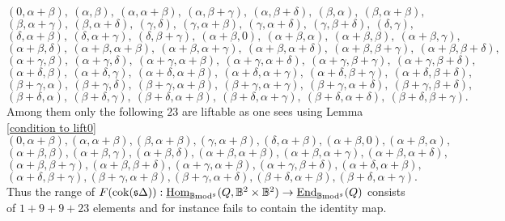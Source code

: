 \documentclass[12pt]{article}
\def\Homi{{\underline{\rm Hom}}}
\def\Endi{{\underline{\rm End}}}
\def\scoker{{\rm cok}}
\def\B{{\mathbb B}}
\def\yb{\mathfrak{s}}
\def\b2{{\rm \B mod^{\mathfrak s}}}
\begin{document}
$$
 (0 , \alpha +\beta  ),\ (
 \alpha  , \beta  ),\ (
 \alpha  , \alpha +\beta  ),\ (
 \alpha  , \beta +\gamma  ),\ (
 \alpha  , \beta +\delta  ),\ (
 \beta  , \alpha  ),\ (
 \beta  , \alpha +\beta  ),\ $$ $$ (
 \beta  , \alpha +\gamma  ),\ (
 \beta  , \alpha +\delta  ),\  (
 \gamma  , \delta  ),\   (
 \gamma  , \alpha +\beta  ),\ (
 \gamma  , \alpha +\delta  ),\ (
 \gamma  , \beta +\delta  ),\ (
 \delta  , \gamma  ),\ $$ $$  (
 \delta  , \alpha +\beta  ),\ (
 \delta  , \alpha +\gamma  ),\  (
 \delta  , \beta +\gamma  ),\ (
 \alpha +\beta  , 0 ),\ (
 \alpha +\beta  , \alpha  ),\ (
 \alpha +\beta  , \beta  ),\  (
 \alpha +\beta  , \gamma  ),\ $$ $$  (
 \alpha +\beta  , \delta  ),\ (
 \alpha +\beta  , \alpha +\beta  ),\   (
 \alpha +\beta  , \alpha +\gamma  ),\ (
 \alpha +\beta  , \alpha +\delta  ),\ (
 \alpha +\beta  , \beta +\gamma  ),\ (
 \alpha +\beta  , \beta +\delta  ),\  $$ $$  (
 \alpha +\gamma  , \beta  ),\ (
 \alpha +\gamma  , \delta  ),\  (
 \alpha +\gamma  , \alpha +\beta  ),\ (
 \alpha +\gamma  , \alpha +\delta  ),\   (
 \alpha +\gamma  , \beta +\gamma  ),\ (
 \alpha +\gamma  , \beta +\delta  ),\ $$ $$ (
 \alpha +\delta  , \beta  ),\ (
 \alpha +\delta  , \gamma  ),\ (
 \alpha +\delta  , \alpha +\beta  ),\   (
 \alpha +\delta  , \alpha +\gamma  ),\   (
 \alpha +\delta  , \beta +\gamma  ),\ (
 \alpha +\delta  , \beta +\delta  ),\ $$ $$(
 \beta +\gamma  , \alpha  ),\ (
 \beta +\gamma  , \delta  ),\ (
 \beta +\gamma  , \alpha +\beta  ),\ (
 \beta +\gamma  , \alpha +\gamma  ),\    (
 \beta +\gamma  , \alpha +\delta  ),\ (
 \beta +\gamma  , \beta +\delta  ),\ $$ $$ (
 \beta +\delta  , \alpha  ),\ (
 \beta +\delta  , \gamma  ),\   (
 \beta +\delta  , \alpha +\beta  ),\ (
 \beta +\delta  , \alpha +\gamma  ),\ (
 \beta +\delta  , \alpha +\delta  ),\ (
 \beta +\delta  , \beta +\gamma  ).
 $$
Among them only the following $23$  are  liftable as one sees using Lemma \ref{condition to lift0} 
$$
(0,\alpha +\beta ),(\alpha ,\alpha +\beta ),(\beta ,\alpha +\beta ),(\gamma ,\alpha +\beta ),(\delta ,\alpha +\beta ),(\alpha +\beta ,0),(\alpha +\beta ,\alpha ),$$ $$(\alpha +\beta ,\beta ),(\alpha +\beta ,\gamma ),(\alpha +\beta ,\delta ),(\alpha +\beta ,\alpha +\beta ),(\alpha +\beta ,\alpha +\gamma ),(\alpha +\beta ,\alpha +\delta ),$$ $$(\alpha +\beta ,\beta +\gamma ),(\alpha +\beta ,\beta +\delta ),(\alpha +\gamma ,\alpha +\beta ),(\alpha +\gamma ,\beta +\delta ),(\alpha +\delta ,\alpha +\beta ),$$ $$(\alpha +\delta ,\beta +\gamma ),(\beta +\gamma ,\alpha +\beta ),(\beta +\gamma ,\alpha +\delta ),(\beta +\delta ,\alpha +\beta ),(\beta +\delta ,\alpha +\gamma ).
$$
 Thus the range of $F(\scoker(\yb\Delta)): \Homi_\b2(Q,\B^2\times \B^2)\to \Endi_\b2(Q)$ consists of $1+9+9+23$ elements and for instance fails to contain the identity map. \vspace{.05in}
 
\end{document}
